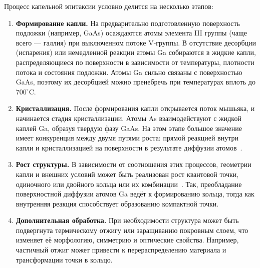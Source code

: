 \documentclass[14pt,oneside]{extarticle}
\begin{document}
Процесс капельной эпитаксии условно делится на несколько этапов:

\begin{enumerate}
    \item \textbf{Формирование капли.} На предварительно подготовленную поверхность\\подложки (например, GaAs) осаждаются атомы элемента III группы (чаще всего — галлия) при выключенном потоке V-группы. В отсутствие десорбции (испарения) или немедленной реакции атомы Ga собираются в жидкие капли, распределяющиеся по поверхности в зависимости от температуры, плотности потока и состояния подложки. Атомы Ga сильно связаны с поверхностью GaAs, поэтому их десорбцией можно пренебречь при температурах вплоть до $700 ^\circ$C.
    
    \item \textbf{Кристаллизация.} После формирования капли открывается поток мышьяка, и начинается стадия кристаллизации. Атомы As взаимодействуют с жидкой каплей Ga, образуя твердую фазу GaAs. На этом этапе большое значение имеет конкуренция между двумя путями роста: прямой реакцией внутри капли и кристаллизацией на поверхности в результате диффузии атомов~\cite{Yamagiwa2020}.
    
    \item \textbf{Рост структуры.} В зависимости от соотношения этих процессов, геометрии капли и внешних условий может быть реализован рост квантовой точки, одиночного или двойного кольца или их комбинации~\cite{Reyes2013}. Так, преобладание поверхностной диффузии атомов Ga ведёт к формированию кольца, тогда как внутренняя реакция способствует образованию компактной точки.
    
    \item \textbf{Дополнительная обработка.} При необходимости структура может быть\\подвергнута термическому отжигу или заращиванию покровным слоем, что изменяет её морфологию, симметрию и оптические свойства. Например, частичный отжиг может привести к перераспределению материала и трансформации точки в кольцо.
\end{enumerate}
\end{document}

